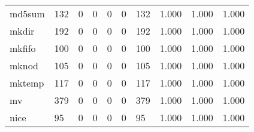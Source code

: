 \begin{longtable}{lp{1.3cm}p{1.3cm}p{1.3cm}p{1.3cm}p{1.3cm}p{1.3cm}p{1.3cm}p{1.3cm}p{1.3cm}}
md5sum    &                    132 &                                  0 &                                 0 &                                0 &                                 0 &                             132 &                                1.000 &                                  1.000 &                                1.000 \\
mkdir     &                    192 &                                  0 &                                 0 &                                0 &                                 0 &                             192 &                                1.000 &                                  1.000 &                                1.000 \\
mkfifo    &                    100 &                                  0 &                                 0 &                                0 &                                 0 &                             100 &                                1.000 &                                  1.000 &                                1.000 \\
mknod     &                    105 &                                  0 &                                 0 &                                0 &                                 0 &                             105 &                                1.000 &                                  1.000 &                                1.000 \\
mktemp    &                    117 &                                  0 &                                 0 &                                0 &                                 0 &                             117 &                                1.000 &                                  1.000 &                                1.000 \\
mv        &                    379 &                                  0 &                                 0 &                                0 &                                 0 &                             379 &                                1.000 &                                  1.000 &                                1.000 \\
nice      &                     95 &                                  0 &                                 0 &                                0 &                                 0 &                              95 &                                1.000 &                                  1.000 &                                1.000 \\

\end{longtable}
